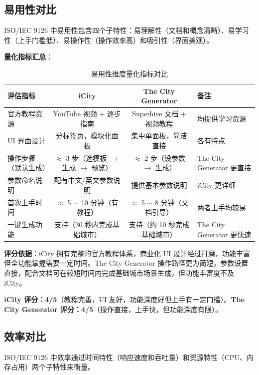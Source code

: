 \documentclass[UTF8,a4paper,10pt]{ctexart}
\begin{document}
\subsection{易用性对比}

ISO/IEC 9126 中易用性包含四个子特性：易理解性（文档和概念清晰）、易学习性（上手门槛低）、易操作性（操作效率高）和吸引性（界面美观）。

\textbf{量化指标汇总}：

\begin{table}[htbp]
\centering
\caption{易用性维度量化指标对比}
\label{tab:usability_quant}
\begin{tabular}{p{2.5cm}ccX}
\toprule
\textbf{评估指标} & \textbf{iCity} & \textbf{The City Generator} & \textbf{备注} \\
\midrule
官方教程资源 & YouTube 视频 + 逐步指南 & Superhive 文档 + 视频教程 & 均提供学习资源 \\
UI 界面设计 & 分标签页，模块化面板 & 集中单面板，简洁直接 & 各有特点 \\
操作步骤（默认生成） & $\approx$ 3 步（选模板 $\rightarrow$ 生成 $\rightarrow$ 预览） & $\approx$ 2 步（设参数 $\rightarrow$ 生成） & The City Generator 更直接 \\
参数命名说明 & 配有中文/英文参数说明 & 提供基本参数说明 & iCity 更详细 \\
首次上手时间 & $\approx$ 5 $\sim$ 10 分钟（有教程） & $\approx$ 5 $\sim$ 8 分钟（文档引导） & 两者上手均较易 \\
一键生成功能 & 支持（30 秒内完成基础城市） & 支持（约 10 秒完成基础城市） & The City Generator 更快速 \\
\bottomrule
\end{tabular}
\end{table}

\textbf{评分依据}：iCity 拥有完整的官方教程体系，商业化 UI 设计经过打磨，功能丰富但全功能掌握需要一定时间。The City Generator 操作路径更为简短，参数设置直接，配合文档可在较短时间内完成基础城市场景生成，但功能丰富度不及 iCity。

\textbf{iCity 评分：4/5}（教程完善，UI 友好，功能深度好但上手有一定门槛）。\textbf{The City Generator 评分：4/5}（操作直接，上手快，但功能深度有限）。

\subsection{效率对比}

ISO/IEC 9126 中效率通过时间特性（响应速度和吞吐量）和资源特性（CPU、内存占用）两个子特性来衡量。
\end{document}

